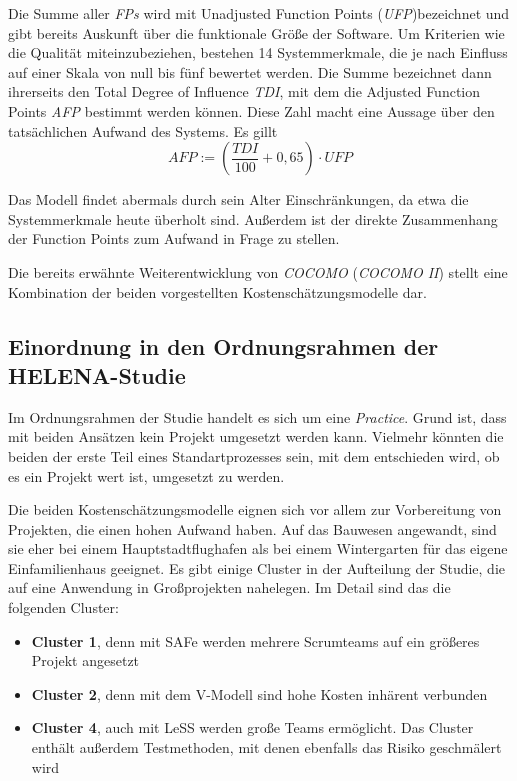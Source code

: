 Die Summe aller \textit{FPs} wird mit Unadjusted Function Points (\textit{UFP})bezeichnet und gibt bereits Auskunft über die funktionale Größe der Software. Um Kriterien wie die Qualität miteinzubeziehen, bestehen 14 Systemmerkmale, die je nach Einfluss auf einer Skala von null bis fünf bewertet werden. Die Summe bezeichnet dann ihrerseits den Total Degree of Influence \textit{TDI}, mit dem die Adjusted Function Points \textit{AFP} bestimmt werden können. Diese Zahl macht eine Aussage über den tatsächlichen Aufwand des Systems. Es gillt 
$$AFP := \left (\frac{TDI}{100}+0,65 \right ) \cdot UFP$$

Das Modell findet abermals durch sein Alter Einschränkungen, da etwa die Systemmerkmale heute überholt sind. Außerdem ist der direkte Zusammenhang der Function Points zum Aufwand in Frage zu stellen.

Die bereits erwähnte Weiterentwicklung von \textit{COCOMO} (\textit{COCOMO II}) stellt eine Kombination der beiden vorgestellten Kostenschätzungsmodelle dar.

\subsection{Einordnung in den Ordnungsrahmen der HELENA-Studie}
Im Ordnungsrahmen der Studie handelt es sich um eine \textit{Practice}. Grund ist, dass mit beiden Ansätzen kein Projekt umgesetzt werden kann. Vielmehr könnten die beiden der erste Teil eines Standartprozesses sein, mit dem entschieden wird, ob es ein Projekt wert ist, umgesetzt zu werden.

Die beiden Kostenschätzungsmodelle eignen sich vor allem zur Vorbereitung von Projekten, die einen hohen Aufwand haben. Auf das Bauwesen angewandt, sind sie eher bei einem Hauptstadtflughafen als bei einem Wintergarten für das eigene Einfamilienhaus geeignet. Es gibt einige Cluster in der Aufteilung der Studie, die auf eine Anwendung in Großprojekten nahelegen. Im Detail sind das die folgenden Cluster:

\begin{itemize}
    \item \textbf{Cluster 1}, denn mit SAFe werden mehrere Scrumteams auf ein größeres Projekt angesetzt
    \item \textbf{Cluster 2}, denn mit dem V-Modell sind hohe Kosten inhärent verbunden
    \item \textbf{Cluster 4}, auch mit LeSS werden große Teams ermöglicht. Das Cluster enthält außerdem Testmethoden, mit denen ebenfalls das Risiko geschmälert wird
\end{itemize}


